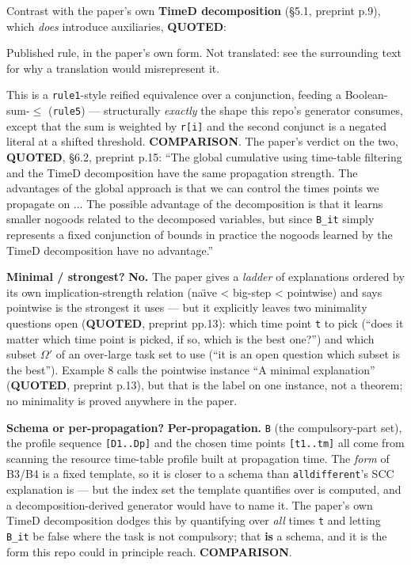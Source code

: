 \documentclass[10pt,a4paper]{article}
\newcommand{\provtag}[2]{{\small\sffamily\bfseries\textcolor{#1}{#2}}}
\newenvironment{pubblock}{%
  \par\smallskip
  \def\FrameCommand{\textcolor{litbar}{\vrule width 2.5pt}\hspace{9pt}}%
  \MakeFramed{\advance\hsize-\width\FrameRestore}}%
  {\endMakeFramed\par\smallskip}
\newcommand{\rulekind}[1]{\par{\small\sffamily\textcolor{litbar}{#1}\par}}
\newcommand{\litline}[1]{\noindent
  \resizebox{\ifdim\width>\linewidth\linewidth\else\width\fi}{!}{#1}\par}
\begin{document}
\begin{pubblock}
Contrast with the paper's own \textbf{TimeD decomposition} (\S{}5.1, preprint p.9), which \emph{does} introduce auxiliaries, \provtag{tagquoted}{QUOTED}:

\rulekind{Published rule, in the paper's own form. Not translated: see the surrounding text for why a translation would misrepresent it.}
{\raggedright
\litline{\ttfamily\small $\forall$t $\in$ [0 .. tmax$-$1], $\forall$i $\in$ [1 .. n] : B\_it $\leftrightarrow$ $\llbracket$s[i] $\leq$ t$\rrbracket$ $\wedge$ $\neg$$\llbracket$s[i] $\leq$ t $-$ d[i]$\rrbracket$}
\litline{\ttfamily\small $\forall$t $\in$ [0 .. tmax$-$1] : $\Sigma$\_\{i$\in$[1..n]\} r[i] $\cdot$ B\_it $\leq$ c}
\par}
This is a \texttt{rule1}-style reified equivalence over a conjunction, feeding a Boolean-sum-\texttt{$\leq$} (\texttt{rule5}) --- structurally \emph{exactly} the shape this repo's generator consumes, except that the sum is weighted by \texttt{r[i]} and the second conjunct is a negated literal at a shifted threshold. \provtag{tagcomparison}{COMPARISON}. The paper's verdict on the two, \provtag{tagquoted}{QUOTED}, \S{}6.2, preprint p.15: ``The global cumulative using time-table filtering and the TimeD decomposition have the same propagation strength. The advantages of the global approach is that we can control the times points we propagate on ... The possible advantage of the decomposition is that it learns smaller nogoods related to the decomposed variables, but since \texttt{B\_it} simply represents a fixed conjunction of bounds in practice the nogoods learned by the TimeD decomposition have no advantage.''

\textbf{Minimal / strongest?} \textbf{No.} The paper gives a \emph{ladder} of explanations ordered by its own implication-strength relation (na\"{\i}ve < big-step < pointwise) and says pointwise is the strongest it uses --- but it explicitly leaves two minimality questions open (\provtag{tagquoted}{QUOTED}, preprint pp.13): which time point \texttt{t} to pick (``does it matter which time point is picked, if so, which is the best one?'') and which subset \texttt{$\Omega$$'$} of an over-large task set to use (``it is an open question which subset is the best''). Example 8 calls the pointwise instance ``A minimal explanation'' (\provtag{tagquoted}{QUOTED}, preprint p.13), but that is the label on one instance, not a theorem; no minimality is proved anywhere in the paper.

\textbf{Schema or per-propagation?} \textbf{Per-propagation.} \texttt{B} (the compulsory-part set), the profile sequence \texttt{[D1..Dp]} and the chosen time points \texttt{[t1..tm]} all come from scanning the resource time-table profile built at propagation time. The \emph{form} of B3/B4 is a fixed template, so it is closer to a schema than \texttt{alldifferent}'s SCC explanation is --- but the index set the template quantifies over is computed, and a decomposition-derived generator would have to name it. The paper's own TimeD decomposition dodges this by quantifying over \emph{all} times \texttt{t} and letting \texttt{B\_it} be false where the task is not compulsory; that \textbf{is} a schema, and it is the form this repo could in principle reach. \provtag{tagcomparison}{COMPARISON}.


\end{pubblock}
\end{document}
